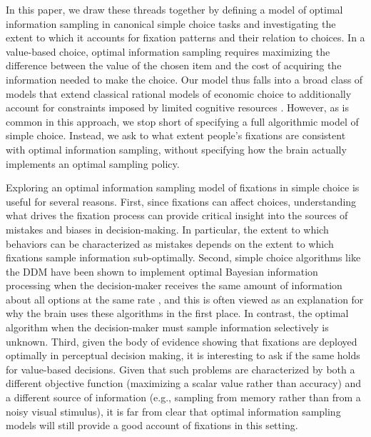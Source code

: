 In this paper, we draw these threads together by defining a model of optimal information sampling in canonical simple choice tasks and investigating the extent to which it accounts for fixation patterns and their relation to choices.  In a value-based choice, optimal information sampling requires maximizing the difference between the value of the chosen item and the cost of acquiring the information needed to make the choice. Our model thus falls into a broad class of models that extend classical rational models of economic choice \citep{savage1954foundations,vonneumann1944theory} to additionally account for constraints imposed by limited cognitive resources \citep{lewis2014computational,griffiths2015rational,lieder2020resourcerational,gershman2015computational,sims1998stickiness,caplin2013behavioral}. However, as is common in this approach, we stop short of specifying a full algorithmic model of simple choice. Instead, we ask to what extent people's fixations are consistent with optimal information sampling, without specifying how the brain actually implements an optimal sampling policy.

Exploring an optimal information sampling model of fixations in simple choice is useful for several reasons. First, since fixations can affect choices, understanding what drives the fixation process can provide critical insight into the sources of mistakes and biases in decision-making. In particular, the extent to which behaviors can be characterized as mistakes depends on the extent to which fixations sample information sub-optimally. 
Second, simple choice algorithms like the DDM have been shown to implement optimal Bayesian information processing when the decision-maker receives the same amount of information about all options at the same rate \citep{bogacz2006physics,moreno-bote2010decision,drugowitsch2012cost,bitzer2014perceptual,tajima2016optimal,tajima2019optimal,fudenberg2018speed}, and this is often viewed as an explanation for why the brain uses these algorithms in the first place. In contrast, the optimal algorithm when the decision-maker must sample information selectively is unknown. Third, given the body of evidence showing that fixations are deployed optimally in perceptual decision making, it is interesting to ask if the same holds for value-based decisions. Given that such problems are characterized by both a different objective function (maximizing a scalar value rather than accuracy) and a different source of information (e.g., sampling from memory \citep{biderman2020what,bakkour2019hippocampus,wang2022mixing} rather than from a noisy visual stimulus), it is far from clear that optimal information sampling models will still provide a good account of fixations in this setting.

